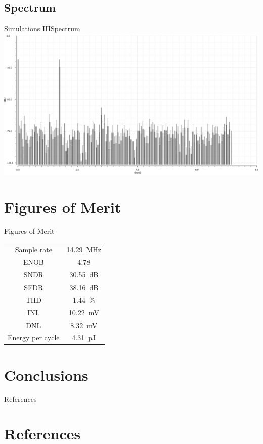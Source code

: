 \documentclass{beamer}
\begin{document}
 \subsection{Spectrum}
 \begin{frame}{Simulations III}{Spectrum}
  \centering
  \includegraphics[width=\textwidth]{img/fft}
 \end{frame}
 \section{Figures of Merit}
 \begin{frame}{Figures of Merit}
  \centering
  \begin{tabular}[]{cc}
   \toprule
   Sample rate & \SI{14.29}{\MHz}\\
   ENOB & \num{4.78}\\
   SNDR & \SI{30.55}{dB}\\
   SFDR & \SI{38.16}{dB}\\
   THD & \SI{1.44}{\percent}\\
   INL & \alert{\SI{10.22}{\mV}}\\
   DNL & \alert{\SI{8.32}{\mV}}\\
   Energy per cycle & \SI{4.31}{\pico\joule}\\\bottomrule
  \end{tabular}
 \end{frame}
 \section{Conclusions}

 \begin{frame}{References}
  \section{References}
  \nocite{*}
  
  
 \end{frame}
\end{document}
